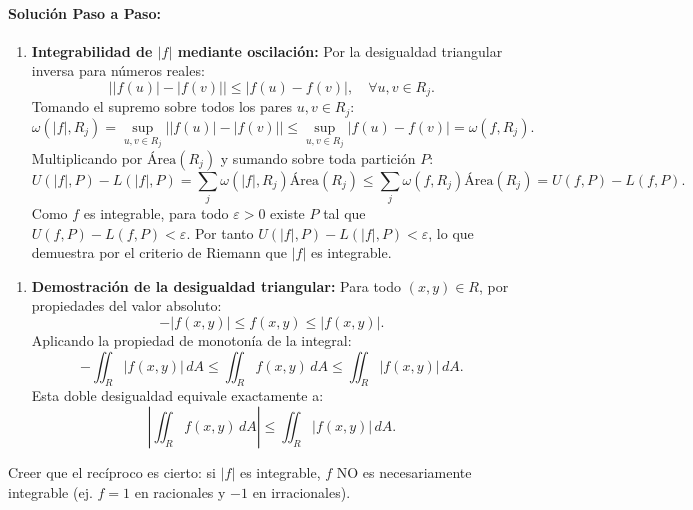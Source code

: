 \documentclass[11pt,a4paper]{article}
\begin{document}
\paragraph{Solución Paso a Paso:}\par
\begin{enumerate}[label=\textbf{\arabic*.}]
\item \textbf{Integrabilidad de $|f|$ mediante oscilación:}
Por la desigualdad triangular inversa para números reales:
\begin{equation*}
\big| |f(u)| - |f(v)| \big| \le |f(u) - f(v)|, \quad \forall u, v \in R_j.
\end{equation*}
Tomando el supremo sobre todos los pares $u, v \in R_j$:
\begin{equation*}
\omega(|f|, R_j) = \sup_{u,v \in R_j} \big| |f(u)| - |f(v)| \big| \le \sup_{u,v \in R_j} |f(u) - f(v)| = \omega(f, R_j).
\end{equation*}
Multiplicando por $\text{Área}(R_j)$ y sumando sobre toda partición $P$:
\begin{equation*}
U(|f|, P) - L(|f|, P) = \sum_{j} \omega(|f|, R_j)\text{Área}(R_j) \le \sum_{j} \omega(f, R_j)\text{Área}(R_j) = U(f, P) - L(f, P).
\end{equation*}
Como $f$ es integrable, para todo $\varepsilon > 0$ existe $P$ tal que $U(f, P) - L(f, P) < \varepsilon$.
Por tanto $U(|f|, P) - L(|f|, P) < \varepsilon$, lo que demuestra por el criterio de Riemann que $|f|$ es integrable.
\end{enumerate}

\begin{enumerate}[label=\textbf{\arabic*.}]
\item \textbf{Demostración de la desigualdad triangular:}
Para todo $(x,y) \in R$, por propiedades del valor absoluto:
\begin{equation*}
-|f(x,y)| \le f(x,y) \le |f(x,y)|.
\end{equation*}
Aplicando la propiedad de monotonía de la integral:
\begin{equation*}
-\iint_R |f(x,y)| \, dA \le \iint_R f(x,y) \, dA \le \iint_R |f(x,y)| \, dA.
\end{equation*}
Esta doble desigualdad equivale exactamente a:
\begin{equation*}
\left| \iint_R f(x,y) \, dA \right| \le \iint_R |f(x,y)| \, dA.
\end{equation*}
\end{enumerate}

\begin{trapbox}
Creer que el recíproco es cierto: si $|f|$ es integrable, $f$ NO es necesariamente integrable (ej. $f = 1$ en racionales y $-1$ en irracionales).
\end{trapbox}
\end{document}
